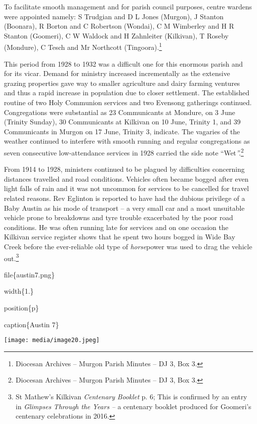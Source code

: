 To facilitate smooth management and for parish council purposes, centre wardens were appointed namely: S Trudgian and D L Jones (Murgon), J Stanton (Boonara), R Borton and C Robertson (Wondai), C M Wimberley and H R Stanton (Goomeri), C W Waldock and H Zahnleiter (Kilkivan), T Roseby (Mondure), C Tesch and Mr Northcott (Tingoora).\footnote{Diocesan Archives -- Murgon Parish Minutes -- DJ 3, Box 3.}

This period from 1928 to 1932 was a difficult one for this enormous parish and for its vicar. Demand for ministry increased incrementally as the extensive grazing properties gave way to smaller agriculture and dairy farming ventures and thus a rapid increase in population due to closer settlement. The established routine of two Holy Communion services and two Evensong gatherings continued. Congregations were substantial as 23 Communicants at Mondure, on 3 June (Trinity Sunday), 30 Communicants at Kilkivan on 10 June, Trinity 1, and 39 Communicants in Murgon on 17 June, Trinity 3, indicate. The vagaries of the weather continued to interfere with smooth running and regular congregations as seven consecutive low-attendance services in 1928 carried the side note ``Wet\emph{''.}\footnote{Diocesan Archives -- Murgon Parish Minutes -- DJ 3, Box 3.}

From 1914 to 1928, ministers continued to be plagued by difficulties concerning distances travelled and road conditions. Vehicles often became bogged after even light falls of rain and it was not uncommon for services to be cancelled for travel related reasons. Rev Eglinton is reported to have had the dubious privilege of a Baby Austin as his mode of transport -- a very small car and a most unsuitable vehicle prone to breakdowns and tyre trouble exacerbated by the poor road conditions. He was often running late for services and on one occasion the Kilkivan service register shows that he spent two hours bogged in Wide Bay Creek before the ever-reliable old type of \emph{horse}power was used to drag the vehicle out.\footnote{St Mathew's Kilkivan \emph{Centenary Booklet} p. 6; This is confirmed by an entry in \emph{Glimpses Through the Years --} a centenary booklet produced for Goomeri's centenary celebrations in 2016.}

file\{austin7.png\}

width\{1.\}

position\{p\}

caption\{Austin 7\}

\texttt{[image: media/image20.jpeg]}

